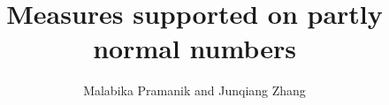 \documentclass[12pt, twoside]{article}
\theoremstyle{definition}
\numberwithin{equation}{section}
\begin{document}
\UseRawInputEncoding
\arraycolsep=1pt

\title{\bf Measures supported on partly normal numbers 
}
\author{Malabika Pramanik and Junqiang Zhang}  
\date{ }
\maketitle
\newcommand{\Addresses}{{%
  \bigskip
  \footnotesize

  M.~Pramanik, \textsc{Department of Mathematics, 1984 Mathematics Road, University of British Columbia, Vancouver, Canada V6T 1Z2} \par\nopagebreak
  \textit{E-mail address}: \texttt{malabika@math.ubc.ca}
  
  \medskip

  J.~Zhang, \textsc{School of Science, China University of Mining and Technology, Beijing 100083, P.~R.~China}\par\nopagebreak
  \textit{E-mail address}: \texttt{jqzhang@cumtb.edu.cn}
  
%

}}

\vspace{-0.8cm}
\end{document}
